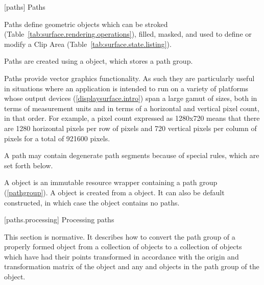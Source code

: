 
 [paths] {Paths}

\pnum
Paths define geometric objects which can be stroked (Table~\ref{tab:surface.rendering.operations}), filled, masked, and used to define or modify a Clip Area (Table~\ref{tab:surface.state.listing}).

\pnum
Paths are created using a  object, which stores a path group. 

\pnum
Paths provide vector graphics functionality. As such they are particularly useful in situations where an application is intended to run on a variety of platforms whose output devices (\ref{displaysurface.intro}) span a large gamut of sizes, both in terms of measurement units and in terms of a horizontal and vertical pixel count, in that order. For example, a pixel count expressed as 1280x720 means that there are 1280 horizontal pixels per row of pixels and 720 vertical pixels per column of pixels for a total of 921600 pixels.
%

\pnum
A path may contain degenerate path segments because of special rules, which are set forth below.

\pnum
A  object is an immutable resource wrapper containing a path group (\ref{pathgroup}). A  object is created from a  object. It can also be default constructed, in which case the  object contains no paths.

 [paths.processing] {Processing paths}

\pnum
This section is normative. It describes how to convert the path group of a properly formed  object from a collection of  objects to a collection of  objects which have had their points transformed in accordance with the origin and transformation matrix of the  object and any  and  objects in the path group of the  object.



